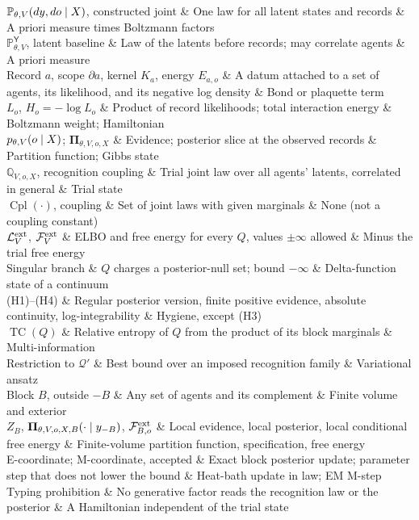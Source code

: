 \begin{decoder}
$\mathbb P_{\theta,V}(dy,do\mid X)$, constructed joint & One law for all latent states and records & A priori measure times Boltzmann factors\\
$\mathbb P^{\mathsf Y}_{\theta,V}$, latent baseline & Law of the latents before records; may correlate agents & A priori measure\\
Record $a$, scope $\partial a$, kernel $K_a$, energy $E_{a,o}$ & A datum attached to a set of agents, its likelihood, and its negative log density & Bond or plaquette term\\
$L_o$, $H_o=-\log L_o$ & Product of record likelihoods; total interaction energy & Boltzmann weight; Hamiltonian\\
$p_{\theta,V}(o\mid X)$; $\boldsymbol\Pi_{\theta,V,o,X}$ & Evidence; posterior slice at the observed records & Partition function; Gibbs state\\
$\mathbb Q_{V,o,X}$, recognition coupling & Trial joint law over all agents' latents, correlated in general & Trial state\\
$\operatorname{Cpl}(\cdot)$, coupling & Set of joint laws with given marginals & None (not a coupling constant)\\
$\mathcal L^{\mathrm{ext}}_V$, $\mathcal F^{\mathrm{ext}}_V$ & ELBO and free energy for every $Q$, values $\pm\infty$ allowed & Minus the trial free energy\\
Singular branch & $Q$ charges a posterior-null set; bound $-\infty$ & Delta-function state of a continuum\\
(H1)--(H4) & Regular posterior version, finite positive evidence, absolute continuity, log-integrability & Hygiene, except (H3)\\
$\operatorname{TC}(Q)$ & Relative entropy of $Q$ from the product of its block marginals & Multi-information\\
Restriction to $\mathcal Q'$ & Best bound over an imposed recognition family & Variational ansatz\\
Block $B$, outside $-B$ & Any set of agents and its complement & Finite volume and exterior\\
$Z_B$, $\boldsymbol\Pi_{\theta,V,o,X,B}(\cdot\mid y_{-B})$, $\mathcal F^{\mathrm{ext}}_{B,o}$ & Local evidence, local posterior, local conditional free energy & Finite-volume partition function, specification, free energy\\
E-coordinate; M-coordinate, accepted & Exact block posterior update; parameter step that does not lower the bound & Heat-bath update in law; EM M-step\\
Typing prohibition & No generative factor reads the recognition law or the posterior & A Hamiltonian independent of the trial state\\
\end{decoder}

